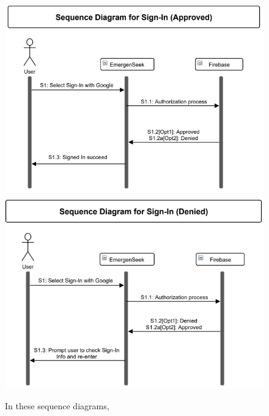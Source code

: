 \documentclass[10pt, a4paper]{article}
\begin{document}
\begin{figure}[H]
  \centerline{
  	\includegraphics[scale=0.6]{diagrams/sequence-4a.png}
  	\includegraphics[scale=0.6]{diagrams/sequence-4b.png}
  }  
  \caption{In these sequence diagrams,}
\end{figure}
\end{document}
